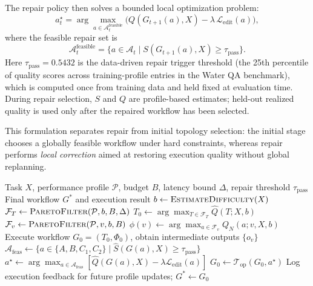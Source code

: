 \documentclass[acmsmall,review,anonymous]{acmart}
\begin{document}
The repair policy then solves a bounded local optimization problem:
\begin{equation}
a_t^\star
=
\arg\max_{a\in\mathcal{A}_t^{\mathrm{feasible}}}
\Big(
Q(G_{t+1}(a),X)-\lambda\,\mathcal{L}_{\mathrm{edit}}(a)
\Big),
\label{eq:repair_obj}
\end{equation}
where the feasible repair set is
\begin{equation}
\mathcal{A}_t^{\mathrm{feasible}}
=
\{a\in\mathcal{A}_t \mid S(G_{t+1}(a),X)\ge\tau_{\mathrm{pass}}\}.
\label{eq:repair_feasible}
\end{equation}
Here $\tau_{\mathrm{pass}}=0.5432$ is the data-driven repair trigger threshold (the 25th percentile of quality scores across training-profile entries in the Water QA benchmark), which is computed once from training data and held fixed at evaluation time. During repair selection, $S$ and $Q$ are profile-based estimates; held-out realized quality is used only after the repaired workflow has been selected.

This formulation separates repair from initial topology selection:
the initial stage chooses a globally feasible workflow under hard constraints, whereas repair performs \emph{local correction} aimed at restoring execution quality without global replanning.

\begin{algorithm}[t]
\caption{TopoGuard Hierarchical Pareto Orchestration}
\label{alg:hpo}
\begin{algorithmic}[1]
\Require Task $X$, performance profile $\mathcal{P}$, budget $B$, latency bound $\Delta$, repair threshold $\tau_{\mathrm{pass}}$
\Ensure Final workflow $G^*$ and execution result
\State $b \gets \textsc{EstimateDifficulty}(X)$ 
\State $\mathcal{F}_T \gets \textsc{ParetoFilter}(\mathcal{P}, b, B, \Delta)$ 
\State $T_0 \gets \arg\max_{T \in \mathcal{F}_T} \hat{Q}(T; X, b)$ 
    \State $\mathcal{F}_v \gets \textsc{ParetoFilter}(\mathcal{P}, v, b, B)$ 
    \State $\phi(v) \gets \arg\max_{a \in \mathcal{F}_v} Q_N(a; v, X, b)$ 
\EndFor
\State Execute workflow $G_0 = (T_0, \Phi_0)$, obtain intermediate outputs $\{o_v\}$
     
        \State $\mathcal{A}_{\mathrm{feas}} \leftarrow
\{a \in \{A,B,C_1,C_2\} \mid \widehat{S}(G(a),X) \ge \tau_{\mathrm{pass}}\}$
        \State $a^\star \leftarrow
\arg\max_{a\in\mathcal{A}_{\mathrm{feas}}}
\left[\widehat{Q}(G(a),X)-\lambda\mathcal{L}_{\mathrm{edit}}(a)\right]$
        \State $G_0 \leftarrow \mathcal{T}_{\mathrm{op}}(G_0,a^\star)$ 
    \EndIf
\EndFor
\State Log execution feedback for future profile updates; \Return $G^* \gets G_0$
\end{algorithmic}
\end{algorithm}
\end{document}
